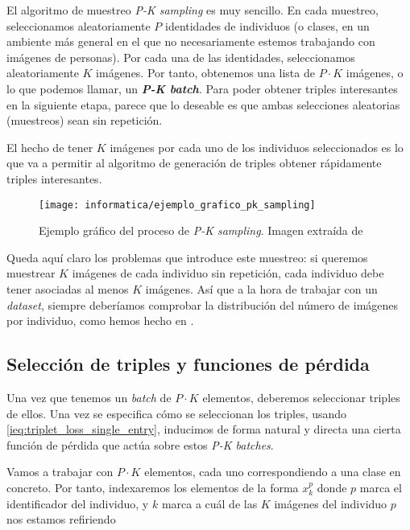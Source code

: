El algoritmo de muestreo \textit{P-K sampling} es muy sencillo. En cada muestreo, seleccionamos aleatoriamente $P$ identidades de individuos (o clases, en un ambiente más general en el que no necesariamente estemos trabajando con imágenes de personas). Por cada una de las identidades, seleccionamos aleatoriamente $K$ imágenes. Por tanto, obtenemos una lista de $P \cdot K$ imágenes, o lo que podemos llamar, un \textbf{\textit{P-K batch}}. Para poder obtener triples interesantes en la siguiente etapa, parece que lo deseable es que ambas selecciones aleatorias (muestreos) sean sin repetición.

El hecho de tener $K$ imágenes por cada uno de los individuos seleccionados es lo que va a permitir al algoritmo de generación de triples obtener rápidamente triples interesantes.

\begin{figure}[H]
    \centering
    \texttt{[image: informatica/ejemplo\_grafico\_pk\_sampling]}
    \caption{Ejemplo gráfico del proceso de \textit{P-K sampling}. Imagen extraída de \cite{informatica:paper_image_pk_sampling}}
\end{figure}

Queda aquí claro los problemas que introduce este muestreo: si queremos muestrear $K$ imágenes de cada individuo sin repetición, cada individuo debe tener asociadas al menos $K$ imágenes. Así que a la hora de trabajar con un \textit{dataset}, siempre deberíamos comprobar la distribución del número de imágenes por individuo, como hemos hecho en .

\subsection{Selección de triples y funciones de pérdida} \label{isubs:seleccion_de_triples}

Una vez que tenemos un \textit{batch} de $P \cdot K$ elementos, deberemos seleccionar triples de ellos. Una vez se especifica cómo se seleccionan los triples, usando \eqref{ieq:triplet_loss_single_entry}, inducimos de forma natural y directa una cierta función de pérdida que actúa sobre estos \textit{P-K batches}.

\begin{observacion}

    Vamos a trabajar con $P \cdot K$ elementos, cada uno correspondiendo a una clase en concreto. Por tanto, indexaremos los elementos de la forma $x_k^p$ donde $p$ marca el identificador del individuo, y $k$ marca a cuál de las $K$ imágenes del individuo $p$ nos estamos refiriendo

\end{observacion}

